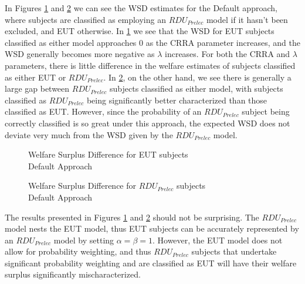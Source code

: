 \documentclass[../main.tex]{subfiles}
\begin{document}
In Figures \ref{fig:HN1_def_wel_eut} and \ref{fig:HN1_def_wel_pre} we can see the WSD estimates for the Default approach, where subjects are classified as employing an $\mathit{RDU_{Prelec}}$ model if it hasn't been excluded, and EUT otherwise.
In \ref{fig:HN1_def_wel_eut} we see that the WSD for EUT subjects classified as either model approaches 0 as the CRRA parameter increases, and the WSD generally becomes more negative as $\lambda$ increases.
For both the CRRA and $\lambda$ parameters, there is little difference in the welfare estimates of subjects classified as either EUT or $\mathit{RDU_{Prelec}}$.
In \ref{fig:HN1_def_wel_pre}, on the other hand, we see there is generally a large gap between $\mathit{RDU_{Prelec}}$ subjects classified as either model, with subjects classified as $\mathit{RDU_{Prelec}}$ being significantly better characterized than those classified as EUT.
However, since the probability of an $\mathit{RDU_{Prelec}}$ subject being correctly classified is so great under this approach, the expected WSD does not deviate very much from the WSD given by the $\mathit{RDU_{Prelec}}$ model.

\begin{figure}[h!]
	\center
	\caption{Welfare Surplus Difference for EUT subjects\\Default Approach}
	\label{fig:HN1_def_wel_eut}
\end{figure}

\begin{figure}[h!]
	\center
	\caption{Welfare Surplus Difference for $\mathit{RDU_{Prelec}}$ subjects\\Default Approach}
	\label{fig:HN1_def_wel_pre}
\end{figure}

The results presented in Figures \ref{fig:HN1_def_wel_eut} and \ref{fig:HN1_def_wel_pre} should not be surprising.
The $\mathit{RDU_{Prelec}}$ model nests the EUT model, thus EUT subjects can be accurately represented by an $\mathit{RDU_{Prelec}}$ model by setting $\alpha = \beta = 1$.
However, the EUT model does not allow for probability weighting, and thus $\mathit{RDU_{Prelec}}$ subjects that undertake significant probability weighting and are classified as EUT will have their welfare surplus significantly mischaracterized.
\end{document}
